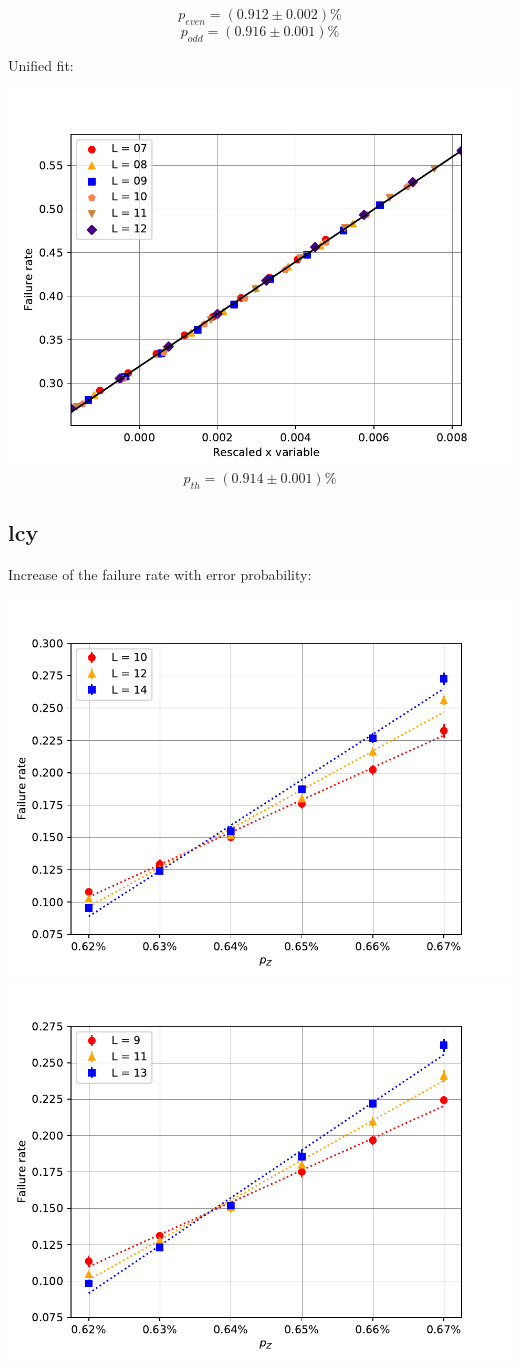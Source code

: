\documentclass[pra]{revtex4-1}
\begin{document}
\[  p_{even} = (0.912 \pm 0.002)\% \]
\[  p_{odd} = (0.916 \pm 0.001)\% \]
\clearpage 

Unified fit: \begin{center} 

\includegraphics[width=.9\textwidth]{../graphs-paper2/hst-dephasing-rescaled.pdf}
\[  p_{th} = (0.914 \pm 0.001)\% \] \end{center}
\clearpage 

\subsection*{lcy}
\noindent Increase of the failure rate with error probability: 
  
\includegraphics[width=.49\textwidth]{../graphs-paper2/lcy-dephasing-even.pdf}
\includegraphics[width=.49\textwidth]{../graphs-paper2/lcy-dephasing-odd.pdf}
\end{document}
